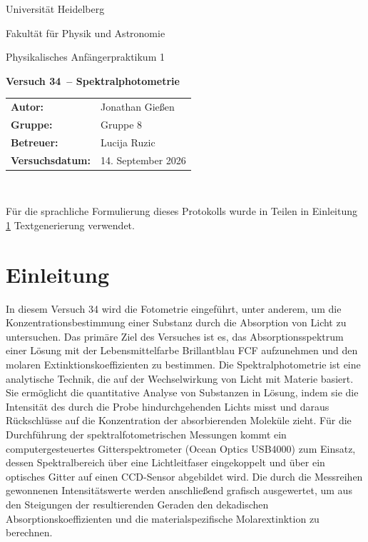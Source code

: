 \documentclass[12pt,a4paper,titlepage]{scrartcl}
\numberwithin{equation}{section}
\numberwithin{table}{section}
\numberwithin{figure}{section}
\newcommand{\versuch}{Versuch 34}
\newcommand{\titel}{Spektralphotometrie}
\newcommand{\praktikum}{Physikalisches Anfängerpraktikum 1}
\newcommand{\autor}{Jonathan Gießen}
\newcommand{\gruppe}{Gruppe 8}
\newcommand{\datum}{14. September 2026}
\newcommand{\betreuer}{Lucija Ruzic}
\begin{document}
\pagestyle{scrheadings}

\begin{titlepage}



    \centering
    \vspace*{4cm}
    {\large Universität Heidelberg\par}
    {\small Fakultät für Physik und Astronomie\par}
    {\Large \praktikum\par}
    \vspace{0.8cm}
    {\LARGE \bfseries \versuch\ -- \titel\par}
    \vspace{1.5cm}

    \begin{tabular}{ll}
        \textbf{Autor:} & \autor\\
        \textbf{Gruppe:} & \gruppe\\
        \textbf{Betreuer:} & \betreuer\\
        \textbf{Versuchsdatum:} & \datum\\
    \end{tabular}

    \vfill
    \hrulefill\
\end{titlepage}

\tableofcontents

\bigskip
\begin{tcolorbox}[colback=gray!5,colframe=gray!60,boxrule=0.8pt,arc=0.01mm,title=KI-Hinweis]
    Für die sprachliche Formulierung dieses Protokolls wurde in Teilen in Einleitung \ref{sec:Einleitung} Textgenerierung verwendet. 
\end{tcolorbox}
\clearpage


\section{Einleitung}\label{sec:Einleitung}
In diesem Versuch 34 wird die Fotometrie eingeführt, unter anderem, um die Konzentrationsbestimmung einer Substanz durch die Absorption von Licht zu untersuchen. Das primäre Ziel des Versuches ist es, das Absorptionsspektrum einer Lösung mit der Lebensmittelfarbe Brillantblau FCF aufzunehmen und den molaren Extinktionskoeffizienten zu bestimmen. Die Spektralphotometrie ist eine analytische Technik, die auf der Wechselwirkung von Licht mit Materie basiert. Sie ermöglicht die quantitative Analyse von Substanzen in Lösung, indem sie die Intensität des durch die Probe hindurchgehenden Lichts misst und daraus Rückschlüsse auf die Konzentration der absorbierenden Moleküle zieht. Für die Durchführung der spektralfotometrischen Messungen kommt ein computergesteuertes Gitterspektrometer (Ocean Optics USB4000) zum Einsatz, dessen Spektralbereich über eine Lichtleitfaser eingekoppelt und über ein optisches Gitter auf einen CCD-Sensor abgebildet wird. Die durch die Messreihen gewonnenen Intensitätswerte werden anschließend grafisch ausgewertet, um aus den Steigungen der resultierenden Geraden den dekadischen Absorptionskoeffizienten und die materialspezifische Molarextinktion zu berechnen.
\end{document}
